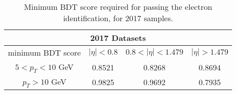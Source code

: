 \begin{table}[ht]
    \centering
    \begin{tabular}{c|c c c}
\hline
\multicolumn{4}{|c|}{2017 Datasets}                                                                 \\
\hline %
minimum BDT score    &  $|\eta| < 0.8 $ & $0.8 < |\eta| < 1.479$ 	& $|\eta| > 1.479$      \\
\hline %
$ 5 < p_T < 10 $ GeV &  0.8521    & 0.8268  	& 0.8694		\\
$p_T > 10$ GeV         &  0.9825    & 0.9692	& 0.7935	\\
\hline %
\hline %
     \end{tabular}
\small
    \caption{Minimum BDT score required for passing the electron identification, for 2017 samples.}%
    \label{tab:ele_ID_WPB}
\end{table}

